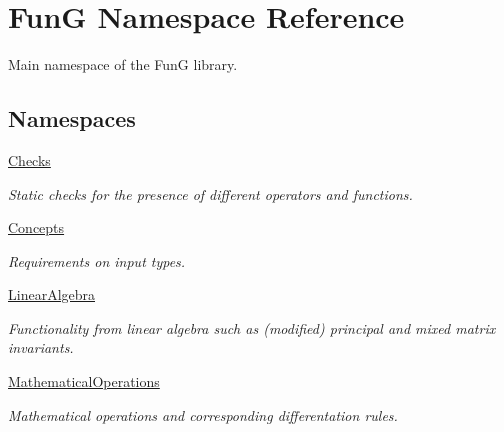 \hypertarget{namespaceFunG}{}\section{Fun\+G Namespace Reference}
\label{namespaceFunG}


Main namespace of the Fun\+G library.  


\subsection*{Namespaces}
\begin{DoxyCompactItemize}
\item 
 \hyperlink{namespaceFunG_1_1Checks}{Checks}
\begin{DoxyCompactList}\small\item\em Static checks for the presence of different operators and functions. \end{DoxyCompactList}\item 
 \hyperlink{namespaceFunG_1_1Concepts}{Concepts}
\begin{DoxyCompactList}\small\item\em Requirements on input types. \end{DoxyCompactList}\item 
 \hyperlink{namespaceFunG_1_1LinearAlgebra}{Linear\+Algebra}
\begin{DoxyCompactList}\small\item\em Functionality from linear algebra such as (modified) principal and mixed matrix invariants. \end{DoxyCompactList}\item 
 \hyperlink{namespaceFunG_1_1MathematicalOperations}{Mathematical\+Operations}
\begin{DoxyCompactList}\small\item\em Mathematical operations and corresponding differentation rules. \end{DoxyCompactList}\end{DoxyCompactItemize}
